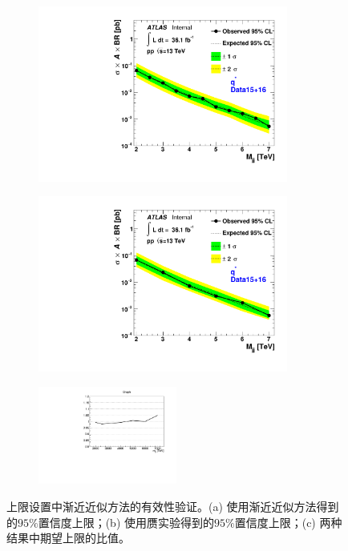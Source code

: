 \begin{figure}[!thbp]
  \begin{subfigure}{.5\textwidth}
  \centering
  \includegraphics[width=0.9\textwidth]{figuresDijet/Appendix-HF/dijet_qStar_limit_asy.pdf}
  \caption{}
  \end{subfigure}
  \begin{subfigure}{.5\textwidth}
  \centering
  \includegraphics[width=0.9\textwidth]{figuresDijet/Appendix-HF/dijet_qStar_limit1.pdf}
  \caption{}
  \end{subfigure}
\newline
  \begin{subfigure}{.99\textwidth}
  \centering
  \includegraphics[width=0.5\textwidth]{figuresDijet/Appendix-HF/Ratio.pdf}
  \caption{}
  \end{subfigure}
  \caption{
  上限设置中渐近近似方法的有效性验证。(a) 使用渐近近似方法得到的$95\%$置信度上限；(b) 使用赝实验得到的$95\%$置信度上限；(c) 两种结果中期望上限的比值。
}
\label{fig:HistVal}
\end{figure}

